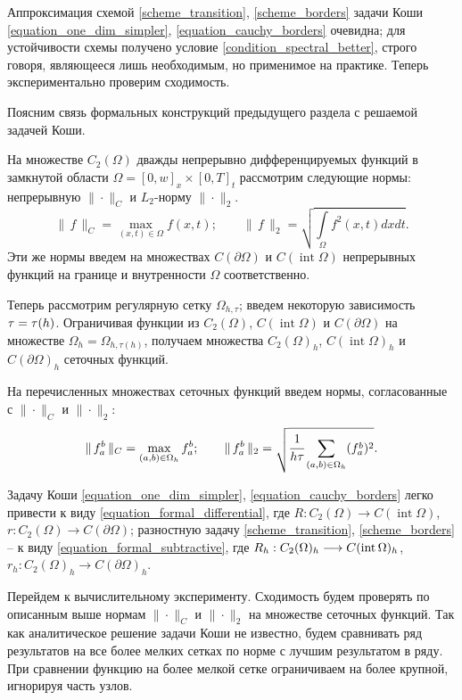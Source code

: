 \documentclass[a4paper,12pt]{article}
\DeclareMathOperator{\Int}{int}
\newcommand*{\hm}[1]{#1\nobreak\discretionary{}
{\hbox{$\mathsurround=0pt #1$}}{}}
\theoremstyle{plain}
\theoremstyle{definition}
\begin{document}
Аппроксимация схемой \eqref{scheme_transition}, \eqref{scheme_borders} задачи Коши \eqref{equation_one_dim_simpler}, \eqref{equation_cauchy_borders} очевидна; для устойчивости схемы получено условие \eqref{condition_spectral_better}, строго говоря, являющееся лишь необходимым, но применимое на практике. Теперь экспериментально проверим сходимость.

Поясним связь формальных конструкций предыдущего раздела с решаемой задачей Коши.

На множестве $C_2(\Omega)$ дважды непрерывно дифференцируемых функций в замкнутой области $\Omega = [0, w]_x \times [0, T]_t$ рассмотрим следующие нормы: непрерывную $\| \cdot \|_C$ и $L_2$-норму $\| \cdot \|_2$.
$$\| \, f \, \|_C = \max\limits_{(x, t) \in \Omega} f(x, t); \qquad \| \, f \, \|_{2} = \sqrt{\int\limits_{\Omega} f^2(x, t) dx dt} \text{.}$$
Эти же нормы введем на множествах $C(\partial \Omega)$ и $C(\Int \Omega)$ непрерывных функций на границе и внутренности $\Omega$ соответственно.

Теперь рассмотрим регулярную сетку $\Omega_{h, \tau}$; введем некоторую зависимость $\tau \hm = \tau(h)$. Ограничивая функции из $C_2(\Omega)$, $C(\Int \Omega)$ и $C(\partial \Omega)$ на множестве $\Omega_h = \Omega_{h, \tau(h)}$, получаем множества $C_2(\Omega)_h$, $C(\Int \Omega)_h$ и $C(\partial \Omega)_h$ сеточных функций.

На перечисленных множествах сеточных функций введем нормы, согласованные с $\| \cdot \|_C$ и $\| \cdot \|_2$:
$$\| \, f_a^b \, \|_C = \max\limits_{(a, b) \in \Omega_h} f_a^b; \qquad \| \, f_a^b \, \|_2 = \sqrt{\cfrac{1}{h \tau}\sum\limits_{(a, b) \in \Omega_h} (f_a^b)^2} \text{.}$$

Задачу Коши \eqref{equation_one_dim_simpler}, \eqref{equation_cauchy_borders} легко привести к виду \eqref{equation_formal_differential}, где $R: C_2(\Omega) \longrightarrow C(\Int \Omega)$, $r: C_2(\Omega) \longrightarrow C(\partial \Omega)$; разностную задачу \eqref{scheme_transition}, \eqref{scheme_borders} -- к виду \eqref{equation_formal_subtractive}, где $R_h: C_2(\Omega)_h \hm \longrightarrow C(\Int \Omega)_h$, $r_h: C_2(\Omega)_h \longrightarrow C(\partial \Omega)_h$.

Перейдем к вычислительному эксперименту. Сходимость будем проверять по описанным выше нормам $\| \cdot \|_C$ и $\| \cdot \|_2$ на множестве сеточных функций. Так как аналитическое решение задачи Коши не известно, будем сравнивать ряд результатов на все более мелких сетках по норме с лучшим результатом в ряду. При сравнении функцию на более мелкой сетке ограничиваем на более крупной, игнорируя часть узлов.
\end{document}
